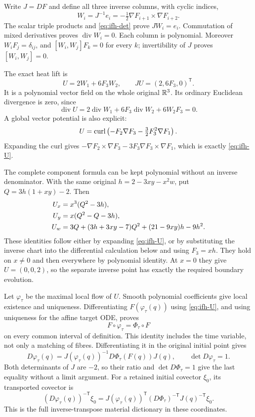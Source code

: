 Write $J=DF$ and define all three inverse columns, with cyclic indices,
\[
 W_i=J^{-1}e_i
 =-\tfrac12\nabla F_{i+1}\times\nabla F_{i+2}.
\]
The scalar triple products and \eqref{eq:ifh-det} prove $JW_i=e_i$.
Commutation of mixed derivatives proves $\operatorname{div}W_i=0$.
Each column is polynomial. Moreover $W_iF_j=\delta_{ij}$, and
$[W_i,W_j]F_k=0$ for every $k$; invertibility of $J$ proves
$[W_i,W_j]=0$.

The exact heat lift is
\begin{equation}
 U=2W_1+6F_3W_2,\qquad JU=(2,6F_3,0)^{\mathsf T}.
 \label{eq:ifh-U}
\end{equation}
It is a polynomial vector field on the whole original $\mathbb R^3$.
Its ordinary Euclidean divergence is zero, since
\[
 \operatorname{div}U
 =2\operatorname{div}W_1+6F_3\operatorname{div}W_2+6W_2F_3=0.
\]
A global vector potential is also explicit:
\begin{equation}
 U=\operatorname{curl}\left(-F_2\nabla F_3-\tfrac32F_3^2\nabla F_1\right).
 \label{eq:ifh-potential}
\end{equation}
Expanding the curl gives
$-\nabla F_2\times\nabla F_3-3F_3\nabla F_3\times\nabla F_1$,
which is exactly \eqref{eq:ifh-U}.

The complete component formula can be kept polynomial without an inverse
denominator. With the same original $h=2-3xy-x^2w$, put
$Q=3h(1+xy)-2$. Then
\begin{align}
 U_x&=x^3(Q^2-3h),\notag\\
 U_y&=x(Q^2-Q-3h),\notag\\
 U_w&=3Q+(3h+3xy-7)Q^2+(21-9xy)h-9h^2.
 \label{eq:ifh-U-components}
\end{align}
These identities follow either by expanding \eqref{eq:ifh-U}, or by
substituting the inverse chart into the differential calculation below
and using $F_3=xh$. They hold on $x\ne0$ and then everywhere by polynomial
identity. At $x=0$ they give $U=(0,0,2)$, so the separate inverse point
has exactly the required boundary evolution.

Let $\varphi_\tau$ be the maximal local flow of $U$. Smooth polynomial
coefficients give local existence and uniqueness. Differentiating
$F(\varphi_\tau(q))$ using \eqref{eq:ifh-U}, and using uniqueness for the
affine target ODE, proves
\begin{equation}
 F\circ\varphi_\tau=\Phi_\tau\circ F
 \label{eq:ifh-flow-intertwining}
\end{equation}
on every common interval of definition. This identity includes the time
variable, not only a matching of fibres.
Differentiating it in the original initial point gives
\begin{equation}
 D\varphi_\tau(q)=
 J(\varphi_\tau(q))^{-1}D\Phi_\tau(F(q))J(q),
 \qquad \det D\varphi_\tau=1.
 \label{eq:ifh-material}
\end{equation}
Both determinants of $J$ are $-2$, so their ratio and
$\det D\Phi_\tau=1$ give the last equality without a limit argument.
For a retained initial covector $\xi_0$, its transported covector is
\[
 (D\varphi_\tau(q))^{-\mathsf T}\xi_0
 =J(\varphi_\tau(q))^{\mathsf T}
   (D\Phi_\tau)^{-\mathsf T}J(q)^{-\mathsf T}\xi_0.
\]
This is the full inverse-transpose material dictionary in these
coordinates.

